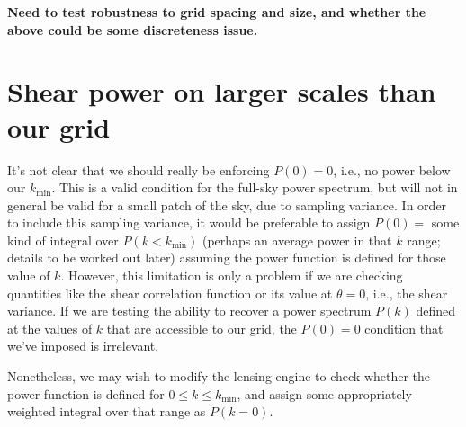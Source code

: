 \documentclass[preprint]{aastex}
\newcommand{\kmin}{\ensuremath{k_\mathrm{min}}}
\begin{document}
\textbf{Need to test robustness to grid spacing and size, and whether
  the above could be some discreteness issue.}

\section{Shear power on larger scales than our grid}\label{S:pk0}

It's not clear that we should really be enforcing $P(0)=0$, i.e., no
power below our \kmin.  This is a valid condition for the full-sky
power spectrum, but will not in general be valid for a small patch of
the sky, due to sampling variance.  In order to include this sampling
variance, it would be preferable to assign $P(0)=$ some kind of
integral over $P(k<\kmin)$ (perhaps an average power in that $k$
range; details to be worked out later) assuming the power function is
defined for those value of $k$.  However, this limitation is only a
problem if we are checking quantities like the shear correlation
function or its value at $\theta=0$, i.e., the shear variance.  If we
are testing the ability to recover a power spectrum $P(k)$ defined at
the values of $k$ that are accessible to our grid, the $P(0)=0$
condition that we've imposed is irrelevant.

Nonetheless, we may wish to modify the lensing engine to check whether
the power function is defined for $0\le k\le\kmin$, and assign some
appropriately-weighted integral over that range as $P(k=0)$.
\end{document}
